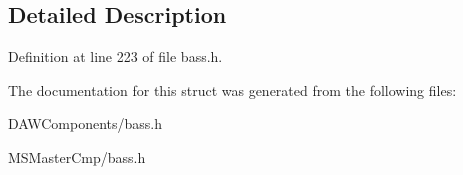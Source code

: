 \subsection{Detailed Description}


Definition at line 223 of file bass.\-h.



The documentation for this struct was generated from the following files\-:\begin{DoxyCompactItemize}
\item 
D\-A\-W\-Components/bass.\-h\item 
M\-S\-Master\-Cmp/bass.\-h\end{DoxyCompactItemize}
